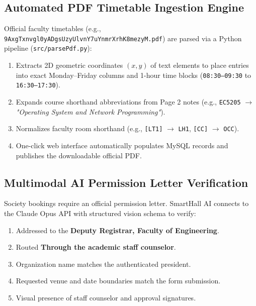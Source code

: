 \documentclass[11pt,a4paper]{article}
\begin{document}
\subsection{Automated PDF Timetable Ingestion Engine}
Official faculty timetables (e.g., \texttt{9AxgTxnvgl0yADgsUzyUlvnY7uYnmrXrhK8mezyM.pdf}) are parsed via a Python pipeline (\texttt{src/parsePdf.py}):
\begin{enumerate}
    \item Extracts 2D geometric coordinates $(x, y)$ of text elements to place entries into exact Monday--Friday columns and 1-hour time blocks (\texttt{08:30--09:30} to \texttt{16:30--17:30}).
    \item Expands course shorthand abbreviations from Page 2 notes (e.g., \texttt{EC5205} $\to$ \textit{"Operating System and Network Programming"}).
    \item Normalizes faculty room shorthand (e.g., \texttt{[LT1]} $\to$ \texttt{LH1}, \texttt{[CC]} $\to$ \texttt{OCC}).
    \item One-click web interface automatically populates MySQL records and publishes the downloadable official PDF.
\end{enumerate}

\subsection{Multimodal AI Permission Letter Verification}
Society bookings require an official permission letter. SmartHall AI connects to the Claude Opus API with structured vision schema to verify:
\begin{enumerate}
    \item Addressed to the \textbf{Deputy Registrar, Faculty of Engineering}.
    \item Routed \textbf{Through the academic staff counselor}.
    \item Organization name matches the authenticated president.
    \item Requested venue and date boundaries match the form submission.
    \item Visual presence of staff counselor and approval signatures.
\end{enumerate}

\end{document}

